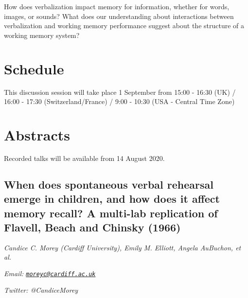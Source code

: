 \documentclass[
  12pt,
]{book}
\begin{document}
How does verbalization impact memory for information, whether for words, images, or sounds? What does our understanding about interactions between verbalization and working memory performance suggest about the structure of a working memory system?

\hypertarget{schedule-1}{%
\section{Schedule}\label{schedule-1}}

This discussion session will take place 1 September from 15:00 - 16:30 (UK) / 16:00 - 17:30 (Switzerland/France) / 9:00 - 10:30 (USA - Central Time Zone)

\hypertarget{abstracts-1}{%
\section{Abstracts}\label{abstracts-1}}

Recorded talks will be available from 14 August 2020.

\hypertarget{when-does-spontaneous-verbal-rehearsal-emerge-in-children-and-how-does-it-affect-memory-recall-a-multi-lab-replication-of-flavell-beach-and-chinsky-1966}{%
\subsection{When does spontaneous verbal rehearsal emerge in children, and how does it affect memory recall? A multi-lab replication of Flavell, Beach and Chinsky (1966)}\label{when-does-spontaneous-verbal-rehearsal-emerge-in-children-and-how-does-it-affect-memory-recall-a-multi-lab-replication-of-flavell-beach-and-chinsky-1966}}

\emph{Candice C. Morey (Cardiff University), Emily M. Elliott, Angela AuBuchon, et al.}

\emph{Email: \href{mailto:moreyc@cardiff.ac.uk}{\nolinkurl{moreyc@cardiff.ac.uk}}}

\emph{Twitter: @CandiceMorey}
\end{document}
